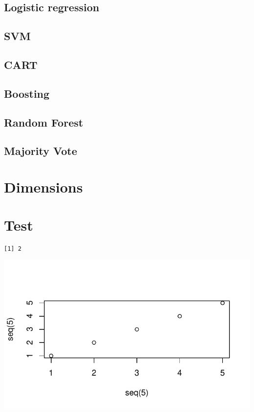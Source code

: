 \documentclass[a4paper,draft=false]{scrreprt}\usepackage[]{graphicx}\usepackage[]{color}
\makeatletter
\def\maxwidth{ %
  \ifdim\Gin@nat@width>\linewidth
    \linewidth
  \else
    \Gin@nat@width
  \fi
}
\newenvironment{kframe}{%
 \def\at@end@of@kframe{}%
 \ifinner\ifhmode%
  \def\at@end@of@kframe{\end{minipage}}%
  \begin{minipage}{\columnwidth}%
 \fi\fi%
 \def\FrameCommand##1{\hskip\@totalleftmargin \hskip-\fboxsep
 \colorbox{shadecolor}{##1}\hskip-\fboxsep
     \hskip-\linewidth \hskip-\@totalleftmargin \hskip\columnwidth}%
 \MakeFramed {\advance\hsize-\width
   \@totalleftmargin\z@ \linewidth\hsize
   \@setminipage}}%
 {\par\unskip\endMakeFramed%
 \at@end@of@kframe}
\newenvironment{knitrout}{}{} %
\makeatother
\begin{document}
\section{Logistic regression} %
\section{SVM} %
\section{CART} %
\section{Boosting} %
\section{Random Forest} %
\section{Majority Vote} %

\chapter{Dimensions} %

\chapter{Test}
\begin{knitrout}
\color{fgcolor}\begin{kframe}
\begin{verbatim}
[1] 2
\end{verbatim}
\end{kframe}
\includegraphics[width=\maxwidth]{figure/chunkname-1} 

\end{knitrout}
\end{document}
